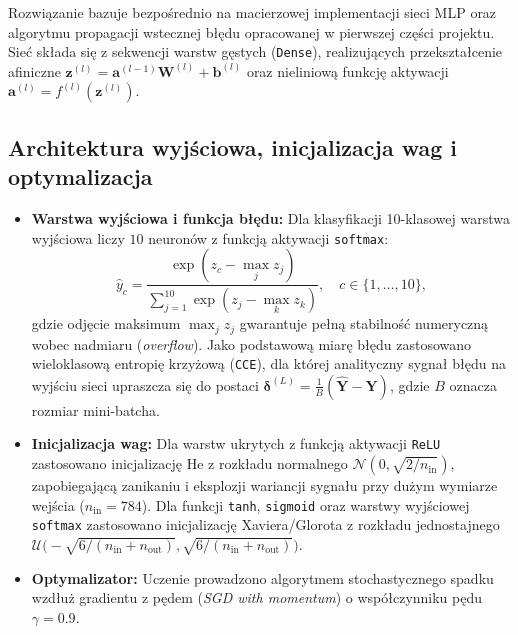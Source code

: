 \documentclass{article}
\begin{document}
Rozwiązanie bazuje bezpośrednio na macierzowej implementacji sieci MLP oraz algorytmu propagacji wstecznej błędu opracowanej w pierwszej części projektu. Sieć składa się z sekwencji warstw gęstych (\texttt{Dense}), realizujących przekształcenie afiniczne $\mathbf{z}^{(l)} = \mathbf{a}^{(l-1)}\mathbf{W}^{(l)} + \mathbf{b}^{(l)}$ oraz nieliniową funkcję aktywacji $\mathbf{a}^{(l)} = f^{(l)}(\mathbf{z}^{(l)})$.

\subsection{Architektura wyjściowa, inicjalizacja wag i optymalizacja}
\begin{itemize}
    \item \textbf{Warstwa wyjściowa i funkcja błędu:} Dla klasyfikacji 10-klasowej warstwa wyjściowa liczy $10$ neuronów z funkcją aktywacji \texttt{softmax}:
    \begin{equation}
        \hat{y}_c = \frac{\exp(z_c - \max_j z_j)}{\sum_{j=1}^{10} \exp(z_j - \max_k z_k)}, \quad c \in \{1, \dots, 10\},
    \end{equation}
    gdzie odjęcie maksimum $\max_j z_j$ gwarantuje pełną stabilność numeryczną wobec nadmiaru (\textit{overflow}). Jako podstawową miarę błędu zastosowano wieloklasową entropię krzyżową (\texttt{CCE}), dla której analityczny sygnał błędu na wyjściu sieci upraszcza się do postaci $\boldsymbol{\delta}^{(L)} = \frac{1}{B}(\hat{\mathbf{Y}} - \mathbf{Y})$, gdzie $B$ oznacza rozmiar mini-batcha.
    \item \textbf{Inicjalizacja wag:} Dla warstw ukrytych z funkcją aktywacji \texttt{ReLU} zastosowano inicjalizację He z rozkładu normalnego $\mathcal{N}(0, \sqrt{2/n_{\text{in}}})$, zapobiegającą zanikaniu i eksplozji wariancji sygnału przy dużym wymiarze wejścia ($n_{\text{in}} = 784$). Dla funkcji \texttt{tanh}, \texttt{sigmoid} oraz warstwy wyjściowej \texttt{softmax} zastosowano inicjalizację Xaviera/Glorota z rozkładu jednostajnego $\mathcal{U}\big(-\sqrt{6/(n_{\text{in}}+n_{\text{out}})}, \sqrt{6/(n_{\text{in}}+n_{\text{out}})}\big)$.
    \item \textbf{Optymalizator:} Uczenie prowadzono algorytmem stochastycznego spadku wzdłuż gradientu z pędem (\textit{SGD with momentum}) o współczynniku pędu $\gamma = 0.9$.
\end{itemize}
\end{document}
